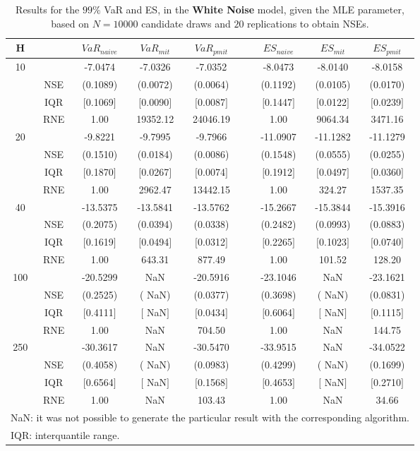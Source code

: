 \footnotesize{  
{ \renewcommand{\arraystretch}{1.3} 
\begin{longtable}{ccccccccc}  
\caption{Results for the $99\%$ VaR and ES, in the \textbf{White Noise} model, given the MLE parameter, based on $N=10000$ candidate draws and $20$ replications to obtain NSEs.} 
\label{tab:res_algos_WN_ML} \\ 
 H & & $VaR_{naive}$ & $VaR_{mit}$ & $VaR_{pmit}$ &  & $ES_{naive}$ & $ES_{mit}$ & $ES_{pmit}$ \\ \hline 
10 & & -7.0474 & -7.0326 & -7.0352 & & -8.0473 & -8.0140 & -8.0158  \\ 
  & NSE & (0.1089) & (0.0072) & (0.0064) & & (0.1192) & (0.0105) & (0.0170)   \\ 
 & IQR & $[$0.1069$]$ & $[$0.0090$]$ & $[$0.0087$]$ & & $[$0.1447$]$ & $[$0.0122$]$ & $[$0.0239$]$  \\  
  & RNE &   1.00 & 19352.12 & 24046.19 & &   1.00 & 9064.34 & 3471.16   \\ [1ex] 
20 & & -9.8221 & -9.7995 & -9.7966 & & -11.0907 & -11.1282 & -11.1279  \\ 
  & NSE & (0.1510) & (0.0184) & (0.0086) & & (0.1548) & (0.0555) & (0.0255)   \\ 
 & IQR & $[$0.1870$]$ & $[$0.0267$]$ & $[$0.0074$]$ & & $[$0.1912$]$ & $[$0.0497$]$ & $[$0.0360$]$  \\  
  & RNE &   1.00 & 2962.47 & 13442.15 & &   1.00 & 324.27 & 1537.35   \\ [1ex] 
40 & & -13.5375 & -13.5841 & -13.5762 & & -15.2667 & -15.3844 & -15.3916  \\ 
  & NSE & (0.2075) & (0.0394) & (0.0338) & & (0.2482) & (0.0993) & (0.0883)   \\ 
 & IQR & $[$0.1619$]$ & $[$0.0494$]$ & $[$0.0312$]$ & & $[$0.2265$]$ & $[$0.1023$]$ & $[$0.0740$]$  \\  
  & RNE &   1.00 & 643.31 & 877.49 & &   1.00 & 101.52 & 128.20   \\ [1ex] 
100 & & -20.5299 &    NaN & -20.5916 & & -23.1046 &    NaN & -23.1621  \\ 
  & NSE & (0.2525) & (   NaN) & (0.0377) & & (0.3698) & (   NaN) & (0.0831)   \\ 
 & IQR & $[$0.4111$]$ & $[$   NaN$]$ & $[$0.0434$]$ & & $[$0.6064$]$ & $[$   NaN$]$ & $[$0.1115$]$  \\  
  & RNE &   1.00 &    NaN & 704.50 & &   1.00 &    NaN & 144.75   \\ [1ex] 
250 & & -30.3617 &    NaN & -30.5470 & & -33.9515 &    NaN & -34.0522  \\ 
  & NSE & (0.4058) & (   NaN) & (0.0983) & & (0.4299) & (   NaN) & (0.1699)   \\ 
 & IQR & $[$0.6564$]$ & $[$   NaN$]$ & $[$0.1568$]$ & & $[$0.4653$]$ & $[$   NaN$]$ & $[$0.2710$]$  \\  
  & RNE &   1.00 &    NaN & 103.43 & &   1.00 &    NaN &  34.66   \\ [1ex] 
\hline 
  \multicolumn{9}{l}{\footnotesize{NaN: it was not possible to generate the particular result with the corresponding algorithm.}} \\ 
  \multicolumn{9}{l}{\footnotesize{IQR: interquantile range.}} \\ 
\end{longtable} 
} 
} 
